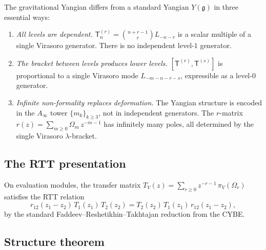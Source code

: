 \documentclass[11pt]{article}
\newcommand{\fg}{\mathfrak{g}}
\begin{document}
\begin{remark}
The gravitational Yangian differs from a standard Yangian $Y(\fg)$
in three essential ways:
\begin{enumerate}[label=(\roman*)]
\item \emph{All levels are dependent.}
  $\mathsf{T}_n^{(r)} = \binom{n+r-1}{r}L_{-n-r}$ is a scalar
  multiple of a single Virasoro generator.  There is no independent
  level-$1$ generator.

\item \emph{The bracket between levels produces lower levels.}
  $[\mathsf{T}^{(r)}, \mathsf{T}^{(s)}]$ is proportional to
  a single Virasoro mode $L_{-m-n-r-s}$, expressible as a
  level-$0$ generator.

\item \emph{Infinite non-formality replaces deformation.}
  The Yangian structure is encoded in the $A_\infty$ tower
  $\{m_k\}_{k \ge 3}$, not in independent generators.  The
  $r$-matrix $r(z) = \sum_{m \ge 0}\Omega_m\,z^{-m-1}$ has
  infinitely many poles, all determined by the single Virasoro
  $\lambda$-bracket.
\end{enumerate}
\end{remark}


\subsection{The RTT presentation}

\begin{proposition}
\label{prop:gy-rtt}
On evaluation modules, the transfer matrix
$T_V(z) = \sum_{r \ge 0} z^{-r-1}\,\pi_V(\Omega_r)$
satisfies the RTT relation
\[
r_{12}(z_1 - z_2)\,T_1(z_1)\,T_2(z_2)
= T_2(z_2)\,T_1(z_1)\,r_{12}(z_1 - z_2),
\]
by the standard Faddeev--Reshetikhin--Takhtajan reduction from the CYBE.
\end{proposition}


\subsection{Structure theorem}
\end{document}
